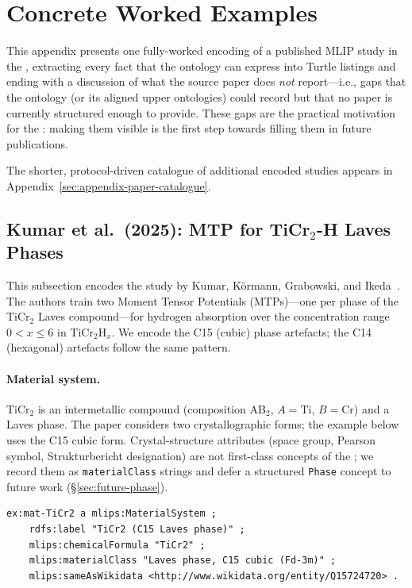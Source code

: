 \section{Concrete Worked Examples}
\label{sec:appendix-worked-examples}

This appendix presents one fully-worked encoding of a published MLIP
study in the \MLIPsOntology{}, extracting every fact that the ontology
can express into Turtle listings and ending with a discussion of what
the source paper does \emph{not} report---i.e., gaps that the ontology
(or its aligned upper ontologies) could record but that no paper is
currently structured enough to provide. These gaps are the practical
motivation for the \MLIPsOntology{}: making them visible is the first
step towards filling them in future publications.

The shorter, protocol-driven catalogue of additional encoded studies
appears in Appendix~\ref{sec:appendix-paper-catalogue}.

\subsection{Kumar et al.\ (2025): MTP for TiCr$_2$-H Laves Phases}
\label{sec:appendix-example-kumar2025}

This subsection encodes the study by Kumar, K\"ormann, Grabowski, and
Ikeda~\cite{kumar2025ticr2h}. The authors train two Moment Tensor
Potentials (MTPs)---one per phase of the TiCr$_2$ Laves
compound---for hydrogen absorption over the concentration range
$0 < x \le 6$ in TiCr$_2$H$_x$. We encode the C15 (cubic) phase
artefacts; the C14 (hexagonal) artefacts follow the same pattern.

\paragraph{Material system.}
TiCr$_2$ is an intermetallic compound (composition AB$_2$,
$A=\mathrm{Ti}$, $B=\mathrm{Cr}$) and a Laves phase. The paper
considers two crystallographic forms; the example below uses the C15
cubic form. Crystal-structure attributes (space group, Pearson symbol,
Strukturbericht designation) are not first-class concepts of the
\MLIPsOntology{}; we record them as \texttt{materialClass} strings and
defer a structured \texttt{Phase} concept to future work
(\S\ref{sec:future-phase}).

\begin{lstlisting}[language=turtle,caption={Material system.}]
ex:mat-TiCr2 a mlips:MaterialSystem ;
    rdfs:label "TiCr2 (C15 Laves phase)" ;
    mlips:chemicalFormula "TiCr2" ;
    mlips:materialClass "Laves phase, C15 cubic (Fd-3m)" ;
    mlips:sameAsWikidata <http://www.wikidata.org/entity/Q15724720> .
\end{lstlisting}


